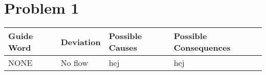 \chapter{Problem 1}
\label{chp:one}


\begin{center}
	\begin{tabular}{ l p{3cm} l l }
		Guide Word & Deviation & Possible Causes & Possible Consequences \\\hline
		NONE & No flow & hej & hej \\\hline
	\end{tabular}
\end{center}